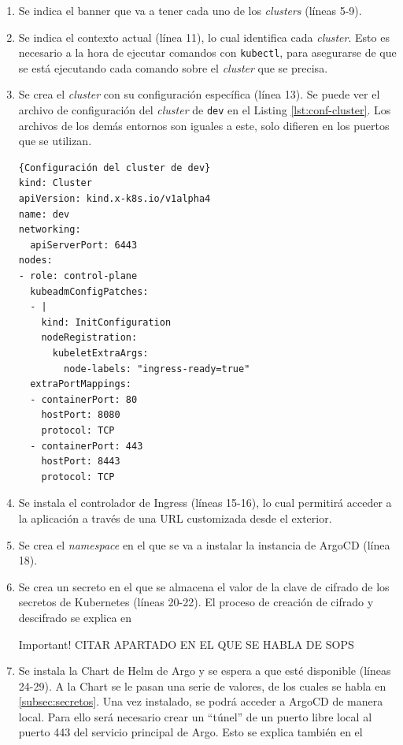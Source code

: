 \begin{enumerate}
  \item Se indica el banner que va a tener cada uno de los \textit{clusters} (líneas 5-9).
  \item Se indica el contexto actual (línea 11), lo cual identifica cada \textit{cluster}. Esto es necesario a la hora de ejecutar comandos con \texttt{kubectl}, para asegurarse de que se está ejecutando cada comando sobre el \textit{cluster} que se precisa.
  \item Se crea el \textit{cluster} con su configuración específica (línea 13). Se puede ver el archivo de configuración del \textit{cluster} de \texttt{dev} en el Listing \ref{lst:conf-cluster}. Los archivos de los demás entornos son iguales a este, solo difieren en los puertos que se utilizan.
\begin{lstlisting}[language=helm,label=lst:conf-cluster]{Configuración del cluster de dev}
kind: Cluster
apiVersion: kind.x-k8s.io/v1alpha4
name: dev
networking:
  apiServerPort: 6443
nodes:
- role: control-plane
  kubeadmConfigPatches:
  - |
    kind: InitConfiguration
    nodeRegistration:
      kubeletExtraArgs:
        node-labels: "ingress-ready=true"
  extraPortMappings:
  - containerPort: 80
    hostPort: 8080
    protocol: TCP
  - containerPort: 443
    hostPort: 8443
    protocol: TCP
\end{lstlisting}
  \item Se instala el controlador de Ingress (líneas 15-16), lo cual permitirá acceder a la aplicación a través de una URL customizada desde el exterior.
  \item Se crea el \textit{namespace} en el que se va a instalar la instancia de ArgoCD (línea 18).
  \item Se crea un secreto en el que se almacena el valor de la clave de cifrado de los secretos de Kubernetes (líneas 20-22). El proceso de creación de cifrado y descifrado se explica en
    \begin{bclogo}[logo=\bcattention]{Important!}
      CITAR APARTADO EN EL QUE SE HABLA DE SOPS
    \end{bclogo}
  \item Se instala la Chart de Helm de Argo y se espera a que esté disponible (líneas 24-29). A la Chart se le pasan una serie de valores, de los cuales se habla en \ref{subsec:secretos}. Una vez instalado, se podrá acceder a ArgoCD de manera local. Para ello será necesario crear un ``túnel'' de un puerto libre local al puerto 443 del servicio principal de Argo. Esto se explica también en el

\end{enumerate}
